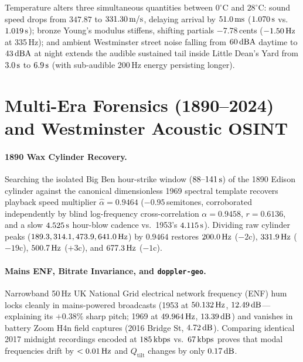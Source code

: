 \documentclass[11pt,a4paper]{article}
\begin{document}
Temperature alters three simultaneous quantities between $0^\circ\text{C}$ and $28^\circ\text{C}$: sound speed drops from $347.87$ to $331.30\text{\,m/s}$, delaying arrival by $51.0\text{\,ms}$ ($1.070\text{\,s}$ vs.\ $1.019\text{\,s}$); bronze Young's modulus stiffens, shifting partials $-7.78$\,cents ($-1.50\text{\,Hz}$ at 335\,Hz); and ambient Westminster street noise falling from $60\text{\,dBA}$ daytime to $43\text{\,dBA}$ at night extends the audible sustained tail inside Little Dean's Yard from $3.0\text{\,s}$ to $6.9\text{\,s}$ (with sub-audible 200\,Hz energy persisting longer).

\section{Multi-Era Forensics (1890--2024) and Westminster Acoustic OSINT}
\paragraph{1890 Wax Cylinder Recovery.} Searching the isolated Big Ben hour-strike window ($88\text{--}141\text{\,s}$) of the 1890 Edison cylinder against the canonical dimensionless 1969 spectral template recovers playback speed multiplier $\hat{\alpha} = 0.9464$ ($-0.95$\,semitones, corroborated independently by blind log-frequency cross-correlation $\alpha = 0.9458$, $r=0.6136$, and a slow $4.525\text{\,s}$ hour-blow cadence vs.\ 1953's $4.115\text{\,s}$). Dividing raw cylinder peaks ($189.3, 314.1, 473.9, 641.0\text{\,Hz}$) by $0.9464$ restores $200.0\text{\,Hz}$ ($-2\text{c}$), $331.9\text{\,Hz}$ ($-19\text{c}$), $500.7\text{\,Hz}$ ($+3\text{c}$), and $677.3\text{\,Hz}$ ($-1\text{c}$).

\paragraph{Mains ENF, Bitrate Invariance, and \texttt{doppler-geo}.} Narrowband 50\,Hz UK National Grid electrical network frequency (ENF) hum locks cleanly in mains-powered broadcasts (1953 at $50.132\text{\,Hz}$, $12.49\text{\,dB}$---explaining its $+0.38\%$ sharp pitch; 1969 at $49.964\text{\,Hz}$, $13.39\text{\,dB}$) and vanishes in battery Zoom H4n field captures (2016 Bridge St, $4.72\text{\,dB}$). Comparing identical 2017 midnight recordings encoded at $185\text{\,kbps}$ vs.\ $67\text{\,kbps}$ proves that modal frequencies drift by $<0.01\text{\,Hz}$ and $Q_{\mathrm{tilt}}$ changes by only $0.17\text{\,dB}$.
\end{document}
